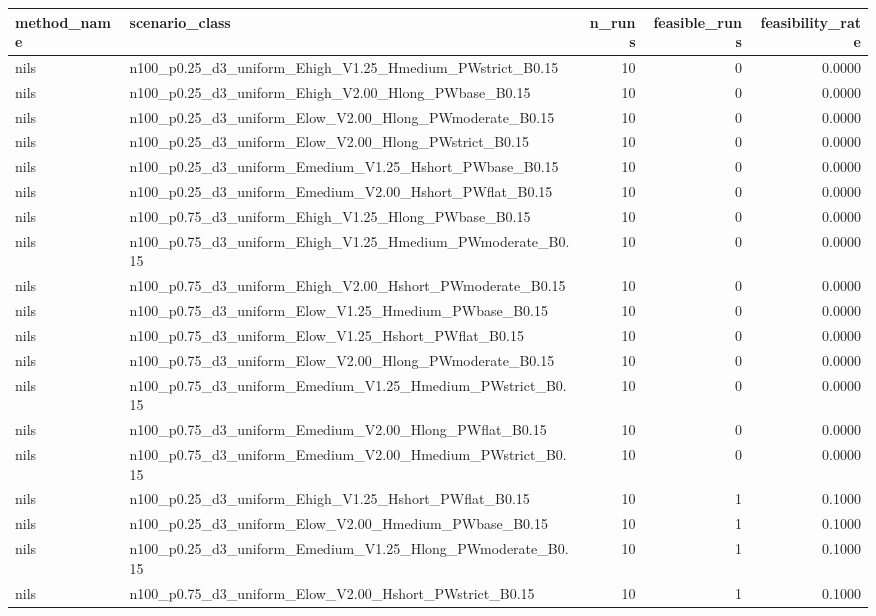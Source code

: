 \begin{tabular}{llrrr}
\toprule
method_name & scenario_class & n_runs & feasible_runs & feasibility_rate \\
\midrule
nils & n100_p0.25_d3_uniform_Ehigh_V1.25_Hmedium_PWstrict_B0.15 & 10 & 0 & 0.0000 \\
nils & n100_p0.25_d3_uniform_Ehigh_V2.00_Hlong_PWbase_B0.15 & 10 & 0 & 0.0000 \\
nils & n100_p0.25_d3_uniform_Elow_V2.00_Hlong_PWmoderate_B0.15 & 10 & 0 & 0.0000 \\
nils & n100_p0.25_d3_uniform_Elow_V2.00_Hlong_PWstrict_B0.15 & 10 & 0 & 0.0000 \\
nils & n100_p0.25_d3_uniform_Emedium_V1.25_Hshort_PWbase_B0.15 & 10 & 0 & 0.0000 \\
nils & n100_p0.25_d3_uniform_Emedium_V2.00_Hshort_PWflat_B0.15 & 10 & 0 & 0.0000 \\
nils & n100_p0.75_d3_uniform_Ehigh_V1.25_Hlong_PWbase_B0.15 & 10 & 0 & 0.0000 \\
nils & n100_p0.75_d3_uniform_Ehigh_V1.25_Hmedium_PWmoderate_B0.15 & 10 & 0 & 0.0000 \\
nils & n100_p0.75_d3_uniform_Ehigh_V2.00_Hshort_PWmoderate_B0.15 & 10 & 0 & 0.0000 \\
nils & n100_p0.75_d3_uniform_Elow_V1.25_Hmedium_PWbase_B0.15 & 10 & 0 & 0.0000 \\
nils & n100_p0.75_d3_uniform_Elow_V1.25_Hshort_PWflat_B0.15 & 10 & 0 & 0.0000 \\
nils & n100_p0.75_d3_uniform_Elow_V2.00_Hlong_PWmoderate_B0.15 & 10 & 0 & 0.0000 \\
nils & n100_p0.75_d3_uniform_Emedium_V1.25_Hmedium_PWstrict_B0.15 & 10 & 0 & 0.0000 \\
nils & n100_p0.75_d3_uniform_Emedium_V2.00_Hlong_PWflat_B0.15 & 10 & 0 & 0.0000 \\
nils & n100_p0.75_d3_uniform_Emedium_V2.00_Hmedium_PWstrict_B0.15 & 10 & 0 & 0.0000 \\
nils & n100_p0.25_d3_uniform_Ehigh_V1.25_Hshort_PWflat_B0.15 & 10 & 1 & 0.1000 \\
nils & n100_p0.25_d3_uniform_Elow_V2.00_Hmedium_PWbase_B0.15 & 10 & 1 & 0.1000 \\
nils & n100_p0.25_d3_uniform_Emedium_V1.25_Hlong_PWmoderate_B0.15 & 10 & 1 & 0.1000 \\
nils & n100_p0.75_d3_uniform_Elow_V2.00_Hshort_PWstrict_B0.15 & 10 & 1 & 0.1000 \\

\end{tabular}
